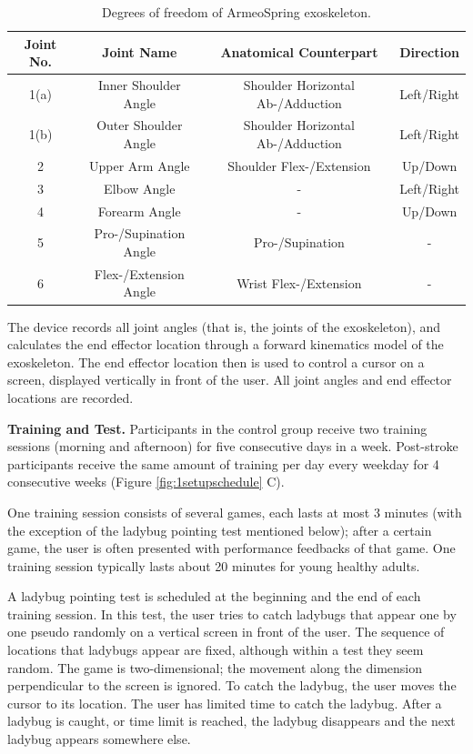 \begin{table}
	\begin{tabular}{c c c c}
		\hline
		Joint No. & Joint Name & Anatomical Counterpart & Direction \\
		\hline
		1(a) & Inner Shoulder Angle & Shoulder Horizontal Ab-/Adduction & Left/Right \\
		1(b) & Outer Shoulder Angle & Shoulder Horizontal Ab-/Adduction & Left/Right \\
		2 & Upper Arm Angle & Shoulder Flex-/Extension & Up/Down \\
		3 & Elbow Angle & - & Left/Right \\
		4 & Forearm Angle & - & Up/Down \\
		5 & Pro-/Supination Angle & Pro-/Supination & - \\ 
		6 & Flex-/Extension Angle & Wrist Flex-/Extension & - \\
		\hline
	\end{tabular}
	\caption{Degrees of freedom of ArmeoSpring exoskeleton.}
	\label{tab:devicedof}
\end{table}

The device records all joint angles (that is, the joints of the exoskeleton), and calculates the end effector location through a forward kinematics model of the exoskeleton. 
The end effector location then is used to control a cursor on a screen, displayed vertically in front of the user. 
All joint angles and end effector locations are recorded.

\textbf{Training and Test.}
Participants in the control group receive two training sessions (morning and afternoon) for five consecutive days in a week.
Post-stroke participants receive the same amount of training per day every weekday for 4 consecutive weeks (Figure \ref{fig:1setupschedule} C).

One training session consists of several games, each lasts at most 3 minutes (with the exception of the ladybug pointing test mentioned below); after a certain game, the user is often presented with performance feedbacks of that game. 
One training session typically lasts about 20 minutes for young healthy adults.

A ladybug pointing test is scheduled at the beginning and the end of each training session. 
In this test, the user tries to catch ladybugs that appear one by one pseudo randomly on a vertical screen in front of the user. 
The sequence of locations that ladybugs appear are fixed, although within a test they seem random.
The game is two-dimensional; the movement along the dimension perpendicular to the screen is ignored. 
To catch the ladybug, the user moves the cursor to its location. 
The user has limited time to catch the ladybug.
After a ladybug is caught, or time limit is reached, the ladybug disappears and the next ladybug appears somewhere else. 

